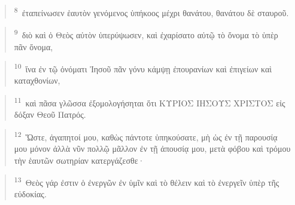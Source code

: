 \documentclass{article}
\newcommand{\currentverse}{1} %
\newcommand{\setcurrentverse}[1]{\renewcommand{\currentverse}{#1}}
\begin{document}
\begin{verse}

\setcurrentverse{8}

\setcounter{footnote}{0}

\textsuperscript{8}~ἐταπείνωσεν ἑαυτὸν γενόμενος ὑπήκοος μέχρι θανάτου, θανάτου δὲ σταυροῦ.

\end{verse}

\begin{verse}

\setcurrentverse{9}

\setcounter{footnote}{0}

\textsuperscript{9}~διὸ καὶ ὁ Θεὸς αὐτὸν ὑπερύψωσεν, καὶ ἐχαρίσατο αὐτῷ τὸ ὄνομα τὸ ὑπὲρ πᾶν ὄνομα,

\end{verse}

\begin{verse}

\setcurrentverse{10}

\setcounter{footnote}{0}

\textsuperscript{10}~ἵνα ἐν τῷ ὀνόματι Ἰησοῦ πᾶν γόνυ κάμψῃ ἐπουρανίων καὶ ἐπιγείων καὶ καταχθονίων,

\end{verse}

\begin{verse}

\setcurrentverse{11}

\setcounter{footnote}{0}

\textsuperscript{11}~καὶ πᾶσα γλῶσσα ἐξομολογήσηται ὅτι ΚΥΡΙΟΣ ΙΗΣΟΥΣ ΧΡΙΣΤΟΣ εἰς δόξαν Θεοῦ Πατρός.

\end{verse}

\begin{verse}

\setcurrentverse{12}

\setcounter{footnote}{0}

\textsuperscript{12}~Ὥστε, ἀγαπητοί μου, καθὼς πάντοτε ὑπηκούσατε, μὴ ὡς ἐν τῇ παρουσίᾳ μου μόνον ἀλλὰ νῦν πολλῷ μᾶλλον ἐν τῇ ἀπουσίᾳ μου, μετὰ φόβου καὶ τρόμου τὴν ἑαυτῶν σωτηρίαν κατεργάζεσθε·

\end{verse}

\begin{verse}

\setcurrentverse{13}

\setcounter{footnote}{0}

\textsuperscript{13}~Θεὸς γάρ ἐστιν ὁ ἐνεργῶν ἐν ὑμῖν καὶ τὸ θέλειν καὶ τὸ ἐνεργεῖν ὑπὲρ τῆς εὐδοκίας.

\end{verse}
\end{document}

